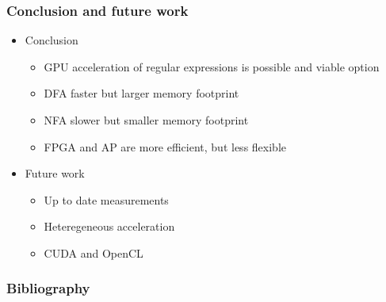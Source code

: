 \documentclass{beamer}
\begin{document}
\begin{frame}[fragile=singleslide]\frametitle{Conclusion and future work}
	\begin{itemize}
		\item Conclusion
		      \begin{itemize}
			      \item GPU acceleration of regular expressions is possible and viable option
			      \item DFA faster but larger memory footprint
			      \item NFA slower but smaller memory footprint
			      \item FPGA and AP are more efficient, but less flexible
		      \end{itemize}
		\item Future work
		      \begin{itemize}
			      \item Up to date measurements
			      \item Heteregeneous acceleration
			      \item CUDA and OpenCL
		      \end{itemize}
	\end{itemize}
\end{frame}

\begin{frame}[fragile=singleslide]\frametitle{Bibliography}
	\fontsize{4}{7.2}
	
	
\end{frame}
\end{document}
